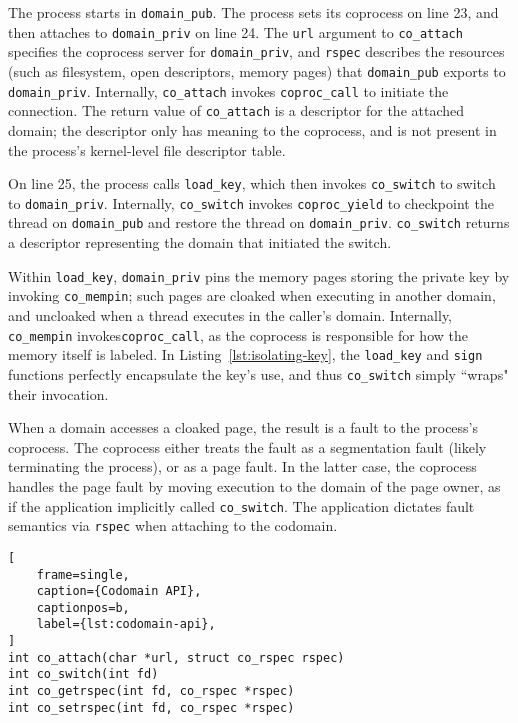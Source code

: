 The process starts in \texttt{domain\_pub}.
%
The process sets its coprocess on line 23, and then attaches to 
\texttt{domain\_priv} on line 24.
%
The \texttt{url} argument to \texttt{co\_attach} specifies the coprocess server
for \texttt{domain\_priv}, and \texttt{rspec} describes the resources (such as
filesystem, open descriptors, memory pages) that \texttt{domain\_pub} exports
to \texttt{domain\_priv}.
%
Internally, \texttt{co\_attach} invokes \texttt{coproc\_call} to initiate the
connection.
%
The return value of \texttt{co\_attach} is a descriptor for the attached
domain; the descriptor only has meaning to the coprocess, and is not present
in the process's kernel-level file descriptor table.


On line 25, the process calls \texttt{load\_key}, which then invokes
\texttt{co\_switch} to switch to \texttt{domain\_priv}.
%
Internally, \texttt{co\_switch} invokes \texttt{coproc\_yield} to checkpoint
the thread on \texttt{domain\_pub} and restore the thread on
\texttt{domain\_priv}.
%
\texttt{co\_switch} returns a descriptor representing the domain that
initiated the switch.


Within \texttt{load\_key}, \texttt{domain\_priv} pins the memory pages storing
the private key by invoking \texttt{co\_mempin};
such pages are cloaked when executing in another
domain, and uncloaked when a thread executes in the caller's domain.
%
Internally, \texttt{co\_mempin} invokes\texttt{coproc\_call}, as the
coprocess is responsible for how the memory itself is labeled.
%
In Listing~\ref{lst:isolating-key}, the \texttt{load\_key} and \texttt{sign}
functions perfectly encapsulate the key's use, and thus  \texttt{co\_switch}
simply ``wraps" their invocation.


When a domain accesses a cloaked page, the result is a fault to the process's
coprocess.
%
The coprocess either treats the fault as a segmentation fault (likely
terminating the process), or as a page fault.
%
In the latter case, the coprocess handles the page fault by moving execution to
the domain of the page owner, as if the application implicitly called
\texttt{co\_switch}.
%
The application dictates fault semantics via \texttt{rspec}
when attaching to the codomain.


\begin{lstlisting}[
    frame=single,
    caption={Codomain API},
    captionpos=b,
    label={lst:codomain-api},
]
int co_attach(char *url, struct co_rspec rspec)
int co_switch(int fd)
int co_getrspec(int fd, co_rspec *rspec)
int co_setrspec(int fd, co_rspec *rspec)
\end{lstlisting}



